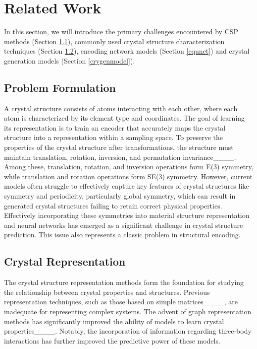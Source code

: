 \section{Related Work}
In this section, we will introduce the primary challenges encountered by CSP methods (Section \ref{profor}), commonly used crystal structure characterization techniques (Section \ref{cryrep}), encoding network models (Section \ref{equnet}) and crystal generation models (Section \ref{crygenmodel}).

\subsection{Problem Formulation}
\label{profor}
A crystal structure consists of atoms interacting with each other, where each atom is characterized by its element type and coordinates. The goal of learning its representation is to train an encoder that accurately maps the crystal structure into a representation within a sampling space. To preserve the properties of the crystal structure after transformations, the structure must maintain translation, rotation, inversion, and permutation invariance____. Among these, translation, rotation, and inversion operations form E(3) symmetry, while translation and rotation operations form SE(3) symmetry. However, current models often struggle to effectively capture key features of crystal structures like symmetry and periodicity, particularly global symmetry, which can result in generated crystal structures failing to retain correct physical properties. Effectively incorporating these symmetries into material structure representation and neural networks has emerged as a significant challenge in crystal structure prediction. This issue also represents a classic problem in structural encoding.

\subsection{Crystal Representation}
\label{cryrep}

The crystal structure representation methods form the foundation for studying the relationship between crystal properties and structures. Previous representation techniques, such as those based on simple matrices____, are inadequate for representing complex systems. The advent of graph representation methods has significantly improved the ability of models to learn crystal properties____. Notably, the incorporation of information regarding three-body interactions has further improved the predictive power of these models.

